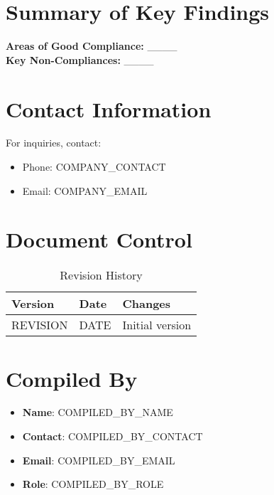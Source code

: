\documentclass[12pt]{article}
\begin{document}
\section{Summary of Key Findings}
\textbf{Areas of Good Compliance:} \_\_\_\_\\
\textbf{Key Non-Compliances:} \_\_\_\_

\section{Contact Information}
For inquiries, contact:
\begin{itemize}
    \item Phone: {{COMPANY_CONTACT}}
    \item Email: {{COMPANY_EMAIL}}
\end{itemize}

\section{Document Control}
\begin{table}[h]
    \centering
    \begin{tabular}{p{3cm}p{3cm}p{6cm}}
        \toprule
        \textbf{Version} & \textbf{Date} & \textbf{Changes} \\
        \midrule
        {{REVISION}} & {{DATE}} & Initial version \\
        \bottomrule
    \end{tabular}
    \caption{Revision History}
\end{table}

\section{Compiled By}
\begin{itemize}
    \item \textbf{Name}: {{COMPILED_BY_NAME}}
    \item \textbf{Contact}: {{COMPILED_BY_CONTACT}}
    \item \textbf{Email}: {{COMPILED_BY_EMAIL}}
    \item \textbf{Role}: {{COMPILED_BY_ROLE}}
\end{itemize}
\end{document}
